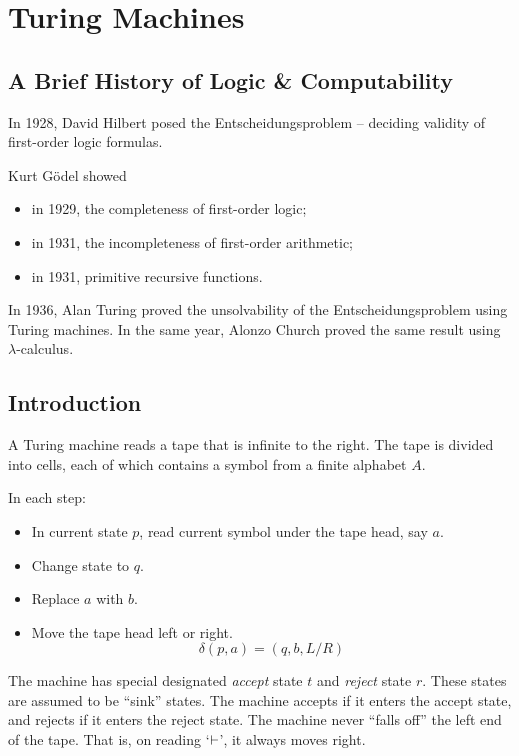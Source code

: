 \chapter{Turing Machines} \label{chp:tm}

\section{A Brief History of Logic \& Computability} \label{sec:history}

In 1928, David Hilbert posed the Entscheidungsproblem -- deciding validity
of first-order logic formulas.

Kurt G\"odel showed
\begin{itemize}
    \item in 1929, the completeness of first-order logic;
    \item in 1931, the incompleteness of first-order arithmetic;
    \item in 1931, primitive recursive functions. %
\end{itemize}

In 1936, Alan Turing proved the unsolvability of the Entscheidungsproblem
using Turing machines.
In the same year, Alonzo Church proved the same result using $\lambda$-calculus.

\section{Introduction} \label{sec:tm:intro}
A Turing machine reads a tape that is infinite to the right.
The tape is divided into cells,
each of which contains a symbol from a finite alphabet $A$.

In each step:
\begin{itemize}
    \item In current state $p$, read current symbol under the tape head,
    say $a$.
    \item Change state to $q$.
    \item Replace $a$ with $b$.
    \item Move the tape head left or right. \[
        \delta(p, a) = (q, b, L/R)
    \]
\end{itemize}

The machine has special designated \emph{accept} state $t$
and \emph{reject} state $r$.
These states are assumed to be ``sink'' states.
The machine accepts if it enters the accept state,
and rejects if it enters the reject state.
The machine never ``falls off'' the left end of the tape.
That is, on reading `${\vdash}$', it always moves right.

